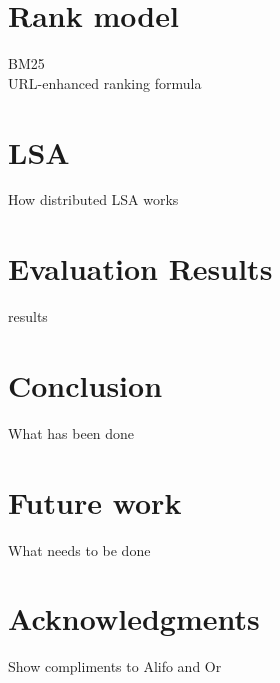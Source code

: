 \documentclass{acm_proc_article-sp}
\begin{document}
\section{Rank model}
BM25\\
URL-enhanced ranking formula

\section{LSA}
How distributed LSA works\\

\section{Evaluation Results}
results\\

\section{Conclusion}
What has been done 

\section{Future work}
What needs to be done

\section{Acknowledgments}
Show compliments to Alifo and Or\\  



\balancecolumns
\end{document}
